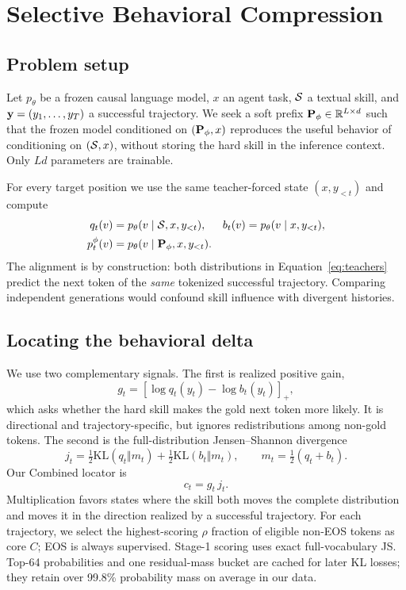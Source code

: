 \section{Selective Behavioral Compression}
\label{sec:method}

\subsection{Problem setup}
Let $p_\theta$ be a frozen causal language model, $x$ an agent task, $\mathcal{S}$ a textual skill, and $\mathbf{y}=(y_1,\ldots,y_T)$ a successful trajectory.  We seek a soft prefix $\mathbf{P}_\phi\in\mathbb{R}^{L\times d}$ such that the frozen model conditioned on $(\mathbf{P}_\phi,x)$ reproduces the useful behavior of conditioning on $(\mathcal{S},x)$, without storing the hard skill in the inference context.  Only $Ld$ parameters are trainable.

For every target position we use the same teacher-forced state $(x,y_{<t})$ and compute
\begin{align}
q_t(v)&=p_\theta(v\mid \mathcal{S},x,y_{<t}), &
b_t(v)&=p_\theta(v\mid x,y_{<t}), \label{eq:teachers}\\
p^\phi_t(v)&=p_\theta(v\mid \mathbf{P}_\phi,x,y_{<t}).
\end{align}
The alignment is by construction: both distributions in Equation~\ref{eq:teachers} predict the next token of the \emph{same} tokenized successful trajectory.  Comparing independent generations would confound skill influence with divergent histories.

\subsection{Locating the behavioral delta}
We use two complementary signals.  The first is realized positive gain,
\begin{equation}
g_t=\left[\log q_t(y_t)-\log b_t(y_t)\right]_+,
\label{eq:gain}
\end{equation}
which asks whether the hard skill makes the gold next token more likely.  It is directional and trajectory-specific, but ignores redistributions among non-gold tokens.  The second is the full-distribution Jensen--Shannon divergence
\begin{equation}
j_t=\tfrac12\mathrm{KL}(q_t\Vert m_t)+\tfrac12\mathrm{KL}(b_t\Vert m_t),\qquad
m_t=\tfrac12(q_t+b_t).
\label{eq:js}
\end{equation}
Our Combined locator is
\begin{equation}
c_t=g_t\,j_t. \label{eq:combined}
\end{equation}
Multiplication favors states where the skill both moves the complete distribution and moves it in the direction realized by a successful trajectory.  For each trajectory, we select the highest-scoring $\rho$ fraction of eligible non-EOS tokens as core $C$; EOS is always supervised.  Stage-1 scoring uses exact full-vocabulary JS.  Top-64 probabilities and one residual-mass bucket are cached for later KL losses; they retain over 99.8\% probability mass on average in our data.

